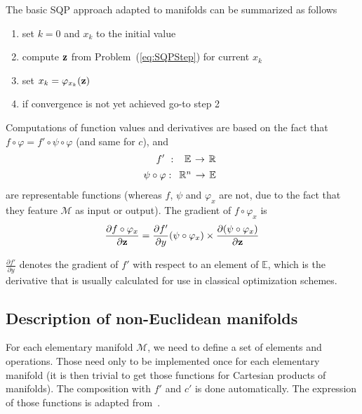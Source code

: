 The basic SQP approach adapted to manifolds can be summarized as follows
\begin{enumerate}
  \item set $k=0$ and $x_k$ to the initial value
  \item compute ${\bf z}$ from Problem~(\ref{eq:SQPStep}) for current $x_k$
  \item set $x_k = \varphi_{x_k}({\bf z})$
  \item if convergence is not yet achieved go-to step 2
\end{enumerate}

Computations of function values and derivatives are based on the fact that $f \circ \varphi = f' \circ \psi \circ \varphi$ (and same for $c$), and
\begin{align}
  f'\ :\
  \begin{array}{ccc}
    \mathbb{E} & \reduce{\rightarrow}{6} & \mathbb{R}
  \end{array} \nonumber\\
  \psi\circ\varphi:
  \begin{array}{ccc}
    \mathbb{R}^n & \reduce{\rightarrow}{6} & \mathbb{E}
  \end{array} \nonumber%
\end{align}
are representable functions (whereas $f$, $\psi$ and $\varphi_x$ are not, due to the fact that they feature $\mathcal{M}$ as input or output).
The gradient of $f \circ \varphi_x$ is
\begin{align}
  \frac{\partial f\circ\varphi_x}{\partial {\bf z}}=
  \frac{\partial f'}{\partial y}(\psi\circ\varphi_x)\times
  \frac{\partial (\psi\circ\varphi_x)}{\partial {\bf z}}
\end{align}

$\frac{\partial f'}{\partial y}$ denotes the gradient of $f'$ with respect to an element of $\mathbb{E}$, which is the derivative that is usually calculated for use in classical optimization schemes.

\subsection{Description of non-Euclidean manifolds}
\label{sub:examples_on_non_euclidean_manifolds}

For each elementary manifold $\mathcal{M}$, we need to define a set of elements and operations.
Those need only to be implemented once for each elementary manifold (it is then trivial to get those functions for Cartesian products of manifolds).
The composition with $f'$ and $c'$ is done automatically.
The expression of those functions is adapted from~\cite{boumal:jmlr:2014}.

